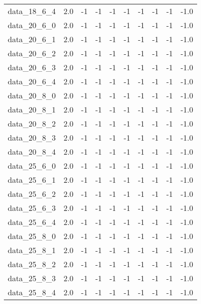 \begin{tabular}{rrrrrrrrrr}
  data\_18\_6\_4 & 2.0 & -1 & -1 & -1 & -1 & -1 & -1 & -1 & -1.0 \\
  data\_20\_6\_0 & 2.0 & -1 & -1 & -1 & -1 & -1 & -1 & -1 & -1.0 \\
  data\_20\_6\_1 & 2.0 & -1 & -1 & -1 & -1 & -1 & -1 & -1 & -1.0 \\
  data\_20\_6\_2 & 2.0 & -1 & -1 & -1 & -1 & -1 & -1 & -1 & -1.0 \\
  data\_20\_6\_3 & 2.0 & -1 & -1 & -1 & -1 & -1 & -1 & -1 & -1.0 \\
  data\_20\_6\_4 & 2.0 & -1 & -1 & -1 & -1 & -1 & -1 & -1 & -1.0 \\
  data\_20\_8\_0 & 2.0 & -1 & -1 & -1 & -1 & -1 & -1 & -1 & -1.0 \\
  data\_20\_8\_1 & 2.0 & -1 & -1 & -1 & -1 & -1 & -1 & -1 & -1.0 \\
  data\_20\_8\_2 & 2.0 & -1 & -1 & -1 & -1 & -1 & -1 & -1 & -1.0 \\
  data\_20\_8\_3 & 2.0 & -1 & -1 & -1 & -1 & -1 & -1 & -1 & -1.0 \\
  data\_20\_8\_4 & 2.0 & -1 & -1 & -1 & -1 & -1 & -1 & -1 & -1.0 \\
  data\_25\_6\_0 & 2.0 & -1 & -1 & -1 & -1 & -1 & -1 & -1 & -1.0 \\
  data\_25\_6\_1 & 2.0 & -1 & -1 & -1 & -1 & -1 & -1 & -1 & -1.0 \\
  data\_25\_6\_2 & 2.0 & -1 & -1 & -1 & -1 & -1 & -1 & -1 & -1.0 \\
  data\_25\_6\_3 & 2.0 & -1 & -1 & -1 & -1 & -1 & -1 & -1 & -1.0 \\
  data\_25\_6\_4 & 2.0 & -1 & -1 & -1 & -1 & -1 & -1 & -1 & -1.0 \\
  data\_25\_8\_0 & 2.0 & -1 & -1 & -1 & -1 & -1 & -1 & -1 & -1.0 \\
  data\_25\_8\_1 & 2.0 & -1 & -1 & -1 & -1 & -1 & -1 & -1 & -1.0 \\
  data\_25\_8\_2 & 2.0 & -1 & -1 & -1 & -1 & -1 & -1 & -1 & -1.0 \\
  data\_25\_8\_3 & 2.0 & -1 & -1 & -1 & -1 & -1 & -1 & -1 & -1.0 \\
  data\_25\_8\_4 & 2.0 & -1 & -1 & -1 & -1 & -1 & -1 & -1 & -1.0 \\\hline
\end{tabular}
